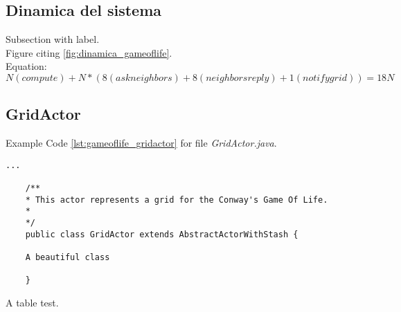 \documentclass[12pt,a4paper,openright,oneside]{report}
\begin{document}
	\subsection{Dinamica del sistema}
	\label{subsec:GameOfLifeDinamica}
	Subsection with label.\\
	Figure citing \ref{fig:dinamica_gameoflife}.\\
	Equation:
	\begin{equation}
	N (compute) + N * (8 (ask neighbors) + 8 (neighbors reply) + 1 (notify grid))
	= 18N
	\label{eq:NumeroMessaggiSoluzioneSemplice}
	\end{equation}
	
	\subsection{GridActor}
	Example Code \ref{lst:gameoflife_gridactor} for file \textit{GridActor.java}.\\
	\begin{lstlisting}[caption=Classe GridActor - Game of Life, label=lst:gameoflife_gridactor]
	...
	
	/**
	* This actor represents a grid for the Conway's Game Of Life.
	* 
	*/
	public class GridActor extends AbstractActorWithStash {
	
	A beautiful class
	
	}
	\end{lstlisting}
	
	A table test.
	
\end{document}
